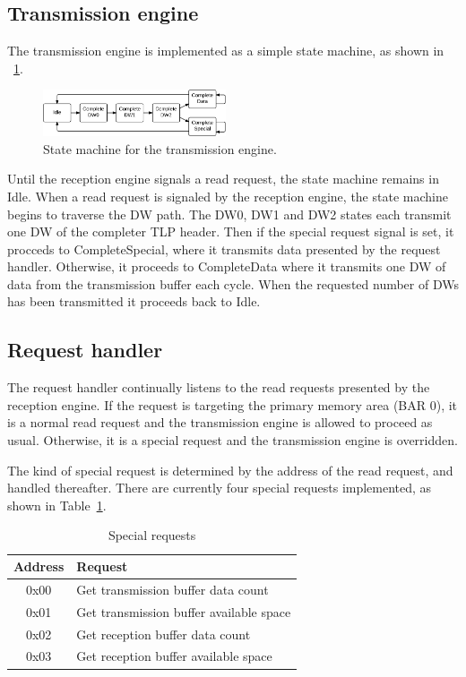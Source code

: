 \subsection{Transmission engine}

The transmission engine is implemented as a simple state machine, as shown in \figurename~\ref{fig:statemachine-transmit}.

\begin{figure}[!ht]
    \centering
    \includegraphics[width=0.48\textwidth]{figures/statemachine-transmit}
    \caption{State machine for the transmission engine.}
    \label{fig:statemachine-transmit}
\end{figure}

Until the reception engine signals a read request, the state machine remains in Idle.
When a read request is signaled by the reception engine, the state machine begins to traverse the DW path.
The DW0, DW1 and DW2 states each transmit one DW of the completer TLP header.
Then if the special request signal is set, it procceds to CompleteSpecial, where it transmits data presented by the request handler.
Otherwise, it proceeds to CompleteData where it transmits one DW of data from the transmission buffer each cycle.
When the requested number of DWs has been transmitted it proceeds back to Idle.

\subsection{Request handler}

The request handler continually listens to the read requests presented by the reception engine.
If the request is targeting the primary memory area (BAR 0), it is a normal read request and the transmission engine is allowed to proceed as usual.
Otherwise, it is a special request and the transmission engine is overridden.

The kind of special request is determined by the address of the read request, and handled thereafter.
There are currently four special requests implemented, as shown in Table~\ref{tab:requests}.

\begin{table}[!ht]
    \renewcommand{\arraystretch}{1.3}
    \caption{Special requests}
    \label{tab:requests}
    \centering
    \begin{tabular}{c|l}
        \bfseries Address & \bfseries Request \\
        \hline
        0x00 & Get transmission buffer data count \\
        0x01 & Get transmission buffer available space \\
        0x02 & Get reception buffer data count \\
        0x03 & Get reception buffer available space \\
    \end{tabular}
\end{table}

